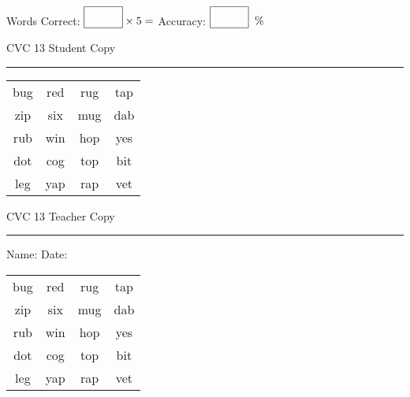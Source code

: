 \documentclass{memoir}
\begin{document}
\small

Words Correct: $\fbox{\phantom{\huge 100}} \times 5 = $ Accuracy: $\fbox{\phantom{\huge 100}}\;\; \%$ 

\vfill

\newpage


\footnotesize \noindent
CVC 13 \hfill Student Copy
\smallskip
\hrule

\Large

\setlength{\tabcolsep}{14pt}
\def\arraystretch{2}

{\selectfont


\begin{vplace}[0.5]
\begin{center}
\begin{tabular}{cccc}
bug & red & rug & tap \\
zip & six & mug & dab \\
rub & win & hop & yes \\
dot & cog & top & bit \\
leg & yap & rap & vet \\
\end{tabular}
\end{center}
\end{vplace}

}

\newpage

\footnotesize \noindent
CVC 13 \hfill Teacher Copy
\smallskip
\hrule

\small

\vfill

\noindent
Name: \underline{\hspace{1.75in}} \hfill Date: \underline{\hspace{1in}}

\Large

{\selectfont


\begin{vplace}[0.5]
\begin{center}
\begin{tabular}{cccc}
bug & red & rug & tap \\
zip & six & mug & dab \\
rub & win & hop & yes \\
dot & cog & top & bit \\
leg & yap & rap & vet \\
\end{tabular}
\end{center}
\end{vplace}



}
\end{document}
